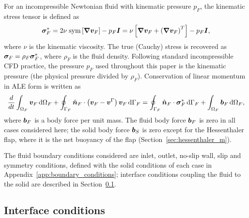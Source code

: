 For an incompressible Newtonian fluid with kinematic pressure $p_F$, the kinematic stress tensor is defined as
\begin{equation}
    \boldsymbol{\sigma}_F^*
    =
    2 \nu \; \text{sym}
    \left[
    \boldsymbol{\nabla} \boldsymbol{v}_F
    \right]
    -
    p_F \boldsymbol{I}
    =
    \nu
    \left[
    \boldsymbol{\nabla} \boldsymbol{v}_F
    +
    \left( \boldsymbol{\nabla} \boldsymbol{v}_F \right)^T
    \right]
    -
    p_F \boldsymbol{I},
    \label{eqn:fluid_stress}
\end{equation}
where $\nu$ is the kinematic viscosity.
The true (Cauchy) stress is recovered as $\boldsymbol{\sigma}_F = \rho_F \boldsymbol{\sigma}_F^*$, where $\rho_F$ is the fluid density.
Following standard incompressible CFD practice, the pressure $p_F$ used throughout this paper is the kinematic pressure (the physical pressure divided by $\rho_F$).
Conservation of linear momentum in ALE form is written as
\begin{equation}
    \frac{d}{dt}
    \int_{\Omega_F}
    \boldsymbol{v}_F
    \, \text{d}\Omega_F
    +
    \oint_{\Gamma_F}
    \hat{\boldsymbol{n}}_F
    \cdot
    \left(
    \boldsymbol{v}_F - \boldsymbol{v}^{\Gamma}
    \right)
    \boldsymbol{v}_F
    \, \text{d}\Gamma_F
    =
    \oint_{\Gamma_F}
    \hat{\boldsymbol{n}}_F
    \cdot
    \boldsymbol{\sigma}_F^*
    \, \text{d}\Gamma_F
    +
    \int_{\Omega_F}
    \boldsymbol{b}_{F}
    \, \text{d}\Omega_F ,
    \label{eqn:fluid_momentum_ale}
\end{equation}
where $\boldsymbol{b}_{F}$ is a body force per unit mass.
The fluid body force $\boldsymbol{b}_F$ is zero in all cases considered here; the solid body force $\boldsymbol{b}_S$ is zero except for the Hessenthaler flap, where it is the net buoyancy of the flap (Section~\ref{sec:hessenthaler_m}).

The fluid boundary conditions considered are inlet, outlet, no-slip wall, slip and symmetry conditions, defined with the solid conditions of each case in Appendix~\ref{app:boundary_conditions}; interface conditions coupling the fluid to the solid are described in Section~\ref{sec:fsi_interface}.

\subsection{Interface conditions}
\label{sec:fsi_interface}

